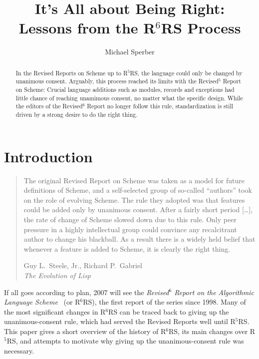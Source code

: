 \documentclass{acm_proc_article-sp}
\newcommand{\rn}[1]{R$^{#1}$RS}
\begin{document}
\title{It's All about Being Right:\\ Lessons from the R{\LARGE$^6$}RS Process}


\author{
\alignauthor
Michael Sperber\\
}

\maketitle

\begin{abstract}
  In the Revised Reports on Scheme up to \rn{5}, the language could
  only be changed by unanimous consent. Arguably, this process reached
  its limits with the Revised$^5$ Report on Scheme: Crucial language
  additions such as modules, records and exceptions had little chance
  of reaching unamimous consent, no matter what the specific design.
  While the editors of the Revised$^6$ Report no longer follow this
  rule, standardization is still driven by a strong desire to do the
  right thing. 
\end{abstract}

\section{Introduction}
\label{sec:intro}

\begin{quote}
  The original Revised Report on Scheme was taken as a model for
  future definitions of Scheme, and a self-selected group of so-called
  ``authors'' took on the role of evolving Scheme. The rule they
  adopted was that features could be added only by unanimous consent.
  After a fairly short period [\ldots], the rate of change of Scheme
  slowed down due to this rule. Only peer pressure in a highly
  intellectual group could convince any recalcitrant author to change
  his blackball. As a result there is a widely held belief that
  whenever a feature is added to Scheme, it is clearly the right
  thing.

  \begin{flushright}
    Guy L.\ Steele, Jr., Richard P.\ Gabriel\\ \textit{The Evolution of
      Lisp}~\cite{SteeleGabriel1993}
  \end{flushright}
\end{quote}
%
If all goes according to plan, 2007 will see the \textit{Revised$^6$
  Report on the Algorithmic Language Scheme}~\cite{R6RS} (or \rn{6}), the first
report of the series since 1998.  Many of the most significant changes
in \rn{6} can be traced back to giving up the unanimous-consent rule,
which had served the Revised Reports well until \rn{5}.  This paper
gives a short overview of the history of \rn{6}, its main changes over
\rn{5}, and attempts to motivate why giving up the unanimous-consent
rule was necessary.
\end{document}
